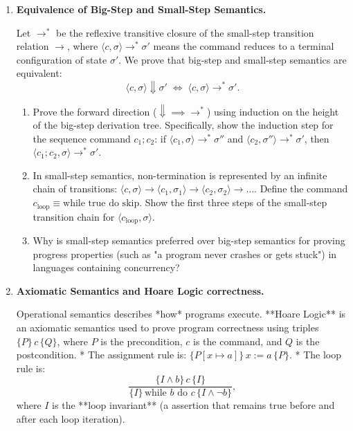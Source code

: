 \documentclass[12pt, a4paper]{book}
\begin{document}
\begin{deepbox}
\begin{enumerate}[label=\textbf{D\arabic*.}]
  \item \textbf{Equivalence of Big-Step and Small-Step Semantics.}
  
        Let $\to^*$ be the reflexive transitive closure of the small-step transition relation $\to$, where $\langle c, \sigma \rangle \to^* \sigma'$ means the command reduces to a terminal configuration of state $\sigma'$.
        We prove that big-step and small-step semantics are equivalent:
        \[
          \langle c, \sigma \rangle \Downarrow \sigma' \;\iff\; \langle c, \sigma \rangle \to^* \sigma'.
        \]
        \begin{enumerate}[label=(\alph*)]
          \item Prove the forward direction ($\Downarrow \implies \to^*$) using induction on the height of the big-step derivation tree.
                Specifically, show the induction step for the sequence command $c_1 ; c_2$: if $\langle c_1, \sigma \rangle \to^* \sigma''$ and $\langle c_2, \sigma'' \rangle \to^* \sigma'$, then $\langle c_1 ; c_2, \sigma \rangle \to^* \sigma'$.
          \item In small-step semantics, non-termination is represented by an infinite chain of transitions: $\langle c, \sigma \rangle \to \langle c_1, \sigma_1 \rangle \to \langle c_2, \sigma_2 \rangle \to \dots$.
                Define the command $c_{\text{loop}} \equiv \text{while true do skip}$.
                Show the first three steps of the small-step transition chain for $\langle c_{\text{loop}}, \sigma \rangle$.
          \item Why is small-step semantics preferred over big-step semantics for proving progress properties (such as "a program never crashes or gets stuck") in languages containing concurrency?
        \end{enumerate}

  \item \textbf{Axiomatic Semantics and Hoare Logic correctness.}
  
        Operational semantics describes *how* programs execute. **Hoare Logic** is an axiomatic semantics used to prove program correctness using triples $\{P\} \, c \, \{Q\}$, where $P$ is the precondition, $c$ is the command, and $Q$ is the postcondition.
        * The assignment rule is: $\{P[x \mapsto a]\} \, x := a \, \{P\}$.
        * The loop rule is:
          \[
            \frac{\{I \land b\} \, c \, \{I\}}{\{I\} \, \text{while } b \text{ do } c \, \{I \land \neg b\}},
          \]
          where $I$ is the **loop invariant** (a assertion that remains true before and after each loop iteration).
          

\end{enumerate}
\end{deepbox}
\end{document}
